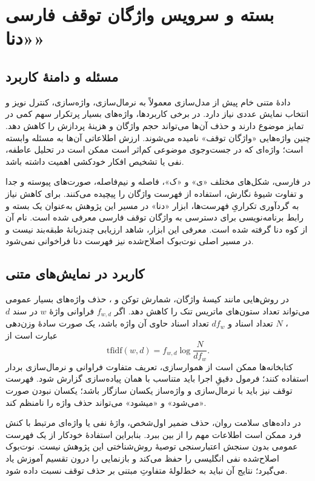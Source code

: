 \chapter{بسته و سرویس واژگان توقف فارسی «دنا»}
\label{app:dena}
\section{مسئله و دامنۀ کاربرد}
دادۀ متنی خام پیش از مدل‌سازی معمولاً به نرمال‌سازی، واژه‌سازی، کنترل نویز و انتخاب نمایش عددی نیاز دارد. در برخی کاربردها، واژه‌های بسیار پرتکرار سهم کمی در تمایز موضوع دارند و حذف آن‌ها می‌تواند حجم واژگان و هزینۀ پردازش را کاهش دهد. چنین واژه‌هایی «واژگان توقف» نامیده می‌شوند. ارزش اطلاعاتی آن‌ها به مسئله وابسته است؛ واژه‌ای که در جست‌وجوی موضوعی کم‌اثر است ممکن است در تحلیل عاطفه، نفی یا تشخیص افکار خودکشی اهمیت داشته باشد.

در فارسی، شکل‌های مختلف «ی» و «ک»، فاصله و نیم‌فاصله، صورت‌های پیوسته و جدا و تفاوت شیوۀ نگارش، استفاده از فهرست واژگان را پیچیده می‌کنند. برای کاهش نیاز به گردآوری تکراریِ فهرست‌ها، ابزار «دنا» در مسیر این پژوهش به‌عنوان یک بسته و رابط برنامه‌نویسی برای دسترسی به واژگان توقف فارسی معرفی شده است. نام آن از کوه دنا گرفته شده است. معرفی این ابزار، شاهد ارزیابی چندزبانۀ طبقه‌بند نیست و در مسیر اصلی نوت‌بوک اصلاح‌شده نیز فهرست دنا فراخوانی نمی‌شود.

\section{کاربرد در نمایش‌های متنی}
در روش‌هایی مانند کیسۀ واژگان، شمارش توکن و ، حذف واژه‌های بسیار عمومی می‌تواند تعداد ستون‌های ماتریس تنک را کاهش دهد. اگر $f_{w,d}$ فراوانی واژۀ $w$ در سند $d$، $N$ تعداد اسناد و $df_w$ تعداد اسناد حاوی آن واژه باشد، یک صورت سادۀ وزن‌دهی عبارت است از
\begin{equation}
\mathrm{tfidf}(w,d)=f_{w,d}\log\frac{N}{df_w}.
\end{equation}
کتابخانه‌ها ممکن است از هموارسازی، تعریف متفاوت فراوانی و نرمال‌سازی بردار استفاده کنند؛ فرمول دقیقِ اجرا باید متناسب با همان پیاده‌سازی گزارش شود. فهرست توقف نیز باید با نرمال‌سازی و واژه‌ساز یکسان سازگار باشد؛ یکسان نبودن صورت «می‌شود» و «میشود» می‌تواند حذف واژه را نامنظم کند.

در داده‌های سلامت روان، حذف ضمیر اول‌شخص، واژۀ نفی یا واژه‌ای مرتبط با کنش فرد ممکن است اطلاعات مهم را از بین ببرد. بنابراین استفادۀ خودکار از یک فهرست عمومی بدون سنجش اعتبارسنجی توصیۀ روش‌شناختی این پژوهش نیست. نوت‌بوک اصلاح‌شده نفی انگلیسی را حفظ می‌کند و بازنمایی را درون تقسیم آموزش یاد می‌گیرد؛ نتایج آن نباید به خط‌لولۀ متفاوتِ مبتنی بر حذف توقف نسبت داده شود.

